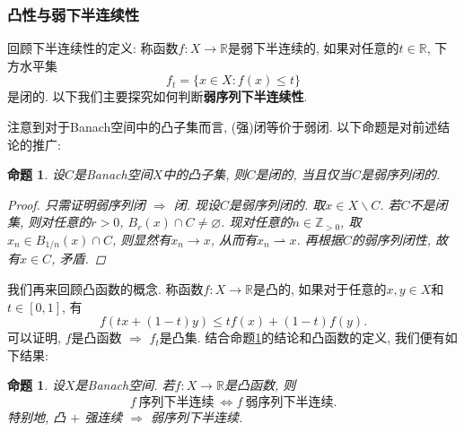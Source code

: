 \documentclass[12pt,a4paper]{article}
\newtheorem{proposition}[theorem]{命题}
\begin{document}
\subsubsection{凸性与弱下半连续性}

回顾下半连续性的定义: 称函数$f\colon X \rightarrow \mathbb{R}$是弱下半连续的, 如果对任意的$t \in \mathbb{R}$, 下方水平集
\begin{equation*}
    f_t = \{x \in X\colon f(x) \leq t\}
\end{equation*}
是闭的. 以下我们主要探究如何判断\textbf{弱序列下半连续性}.

注意到对于Banach空间中的凸子集而言, (强)闭等价于弱闭. 以下命题是对前述结论的推广:

\begin{proposition}\label{prop2.28}
    设$C$是Banach空间$X$中的凸子集, 则$C$是闭的, 当且仅当$C$是弱序列闭的.
    \begin{proof}
        只需证明弱序列闭 $\Rightarrow$ 闭. 现设$C$是弱序列闭的. 取$x \in X \smallsetminus C$.
        若$C$不是闭集, 则对任意的$r > 0$, $B_r(x) \cap C \neq \varnothing$. 
        现对任意的$n \in \mathbb{Z}_{>0}$, 取$x_n \in B_{1/n}(x) \cap C$, 则显然有$x_n \rightarrow x$, 从而有$x_n \rightharpoonup x$.
        再根据$C$的弱序列闭性, 故有$x \in C$, 矛盾. 
    \end{proof}
\end{proposition}

我们再来回顾凸函数的概念. 称函数$f\colon X \rightarrow \mathbb{R}$是凸的, 如果对于任意的$x, y \in X$和$t \in [0, 1]$, 有 
\begin{equation*}
    f(tx + (1 - t)y) \leq tf(x) + (1 - t)f(y).
\end{equation*}
可以证明, $f$是凸函数 $\Rightarrow$ $f_t$是凸集. 结合命题\ref{prop2.28}的结论和凸函数的定义, 我们便有如下结果:

\begin{proposition}
    设$X$是Banach空间. 若$f\colon X \rightarrow \mathbb{R}$是凸函数, 则 
    \begin{equation*}
        f\ \text{序列下半连续}\ \Longleftrightarrow f\ \text{弱序列下半连续}.
    \end{equation*}
    特别地, 凸 $+$ 强连续 $\Rightarrow$ 弱序列下半连续.
\end{proposition}
\end{document}
